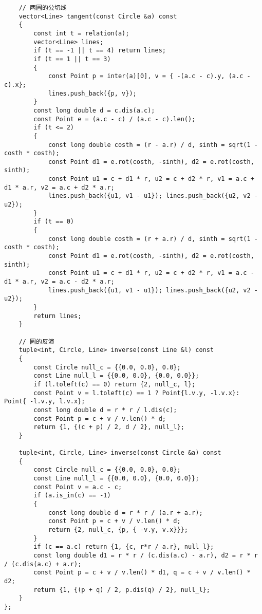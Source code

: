 \documentclass[a4paper,10pt]{article}
\begin{document}
\begin{lstlisting}
    // 两圆的公切线
    vector<Line> tangent(const Circle &a) const
    {
        const int t = relation(a);
        vector<Line> lines;
        if (t == -1 || t == 4) return lines;
        if (t == 1 || t == 3)
        {
            const Point p = inter(a)[0], v = { -(a.c - c).y, (a.c - c).x};
            lines.push_back({p, v});
        }
        const long double d = c.dis(a.c);
        const Point e = (a.c - c) / (a.c - c).len();
        if (t <= 2)
        {
            const long double costh = (r - a.r) / d, sinth = sqrt(1 - costh * costh);
            const Point d1 = e.rot(costh, -sinth), d2 = e.rot(costh, sinth);
            const Point u1 = c + d1 * r, u2 = c + d2 * r, v1 = a.c + d1 * a.r, v2 = a.c + d2 * a.r;
            lines.push_back({u1, v1 - u1}); lines.push_back({u2, v2 - u2});
        }
        if (t == 0)
        {
            const long double costh = (r + a.r) / d, sinth = sqrt(1 - costh * costh);
            const Point d1 = e.rot(costh, -sinth), d2 = e.rot(costh, sinth);
            const Point u1 = c + d1 * r, u2 = c + d2 * r, v1 = a.c - d1 * a.r, v2 = a.c - d2 * a.r;
            lines.push_back({u1, v1 - u1}); lines.push_back({u2, v2 - u2});
        }
        return lines;
    }

    // 圆的反演
    tuple<int, Circle, Line> inverse(const Line &l) const
    {
        const Circle null_c = {{0.0, 0.0}, 0.0};
        const Line null_l = {{0.0, 0.0}, {0.0, 0.0}};
        if (l.toleft(c) == 0) return {2, null_c, l};
        const Point v = l.toleft(c) == 1 ? Point{l.v.y, -l.v.x}: Point{ -l.v.y, l.v.x};
        const long double d = r * r / l.dis(c);
        const Point p = c + v / v.len() * d;
        return {1, {(c + p) / 2, d / 2}, null_l};
    }

    tuple<int, Circle, Line> inverse(const Circle &a) const
    {
        const Circle null_c = {{0.0, 0.0}, 0.0};
        const Line null_l = {{0.0, 0.0}, {0.0, 0.0}};
        const Point v = a.c - c;
        if (a.is_in(c) == -1)
        {
            const long double d = r * r / (a.r + a.r);
            const Point p = c + v / v.len() * d;
            return {2, null_c, {p, { -v.y, v.x}}};
        }
        if (c == a.c) return {1, {c, r*r / a.r}, null_l};
        const long double d1 = r * r / (c.dis(a.c) - a.r), d2 = r * r / (c.dis(a.c) + a.r);
        const Point p = c + v / v.len() * d1, q = c + v / v.len() * d2;
        return {1, {(p + q) / 2, p.dis(q) / 2}, null_l};
    }
};


\end{lstlisting}
\end{document}
